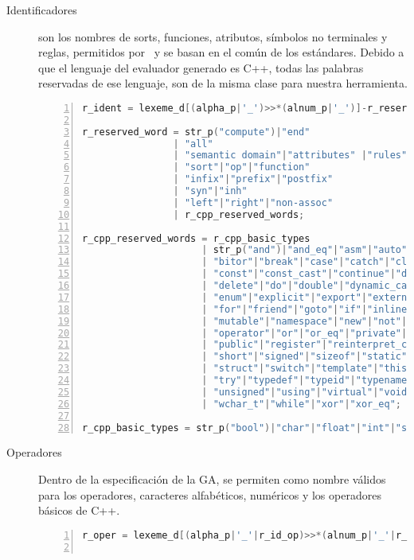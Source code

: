 \begin{description}
\item [Identificadores] son los nombres de sorts, funciones, atributos, símbolos no terminales y reglas, permitidos por \maggen\ y se basan en el común de los estándares. Debido a que el lenguaje del evaluador generado es C++, todas las palabras reservadas de ese lenguaje, son de la misma clase para nuestra herramienta.

\begin{lstlisting}[language=C++, basicstyle=\scriptsize, numbers=left, numbersep=5pt, numberstyle=\tiny]
r_ident = lexeme_d[(alpha_p|'_')>>*(alnum_p|'_')]-r_reserved_word;

r_reserved_word = str_p("compute")|"end"
                | "all"
                | "semantic domain"|"attributes" |"rules"
                | "sort"|"op"|"function"
                | "infix"|"prefix"|"postfix"
                | "syn"|"inh"
                | "left"|"right"|"non-assoc"
                | r_cpp_reserved_words;

r_cpp_reserved_words = r_cpp_basic_types
                     | str_p("and")|"and_eq"|"asm"|"auto"|"bitand"
                     | "bitor"|"break"|"case"|"catch"|"class"|"compl"
                     | "const"|"const_cast"|"continue"|"default"
                     | "delete"|"do"|"double"|"dynamic_cast"|"else"
                     | "enum"|"explicit"|"export"|"extern"|"false"
                     | "for"|"friend"|"goto"|"if"|"inline"|"long"
                     | "mutable"|"namespace"|"new"|"not"|"not_eq"
                     | "operator"|"or"|"or_eq"|"private"|"protected"
                     | "public"|"register"|"reinterpret_cast"|"return"
                     | "short"|"signed"|"sizeof"|"static"|"static_cast"
                     | "struct"|"switch"|"template"|"this"|"throw"|"true"
                     | "try"|"typedef"|"typeid"|"typename"|"union"
                     | "unsigned"|"using"|"virtual"|"void"|"volatile"
                     | "wchar_t"|"while"|"xor"|"xor_eq";

r_cpp_basic_types = str_p("bool")|"char"|"float"|"int"|"string";
\end{lstlisting}

\item [Operadores] Dentro de la especificación de la GA, se permiten como nombre válidos para los operadores, caracteres alfabéticos, numéricos y los operadores básicos de C++. 

\begin{lstlisting}[language=C++, basicstyle=\scriptsize, numbers=left, numbersep=5pt, numberstyle=\tiny]
r_oper = lexeme_d[(alpha_p|'_'|r_id_op)>>*(alnum_p|'_'|r_id_op)];


\end{lstlisting}
\end{description}
